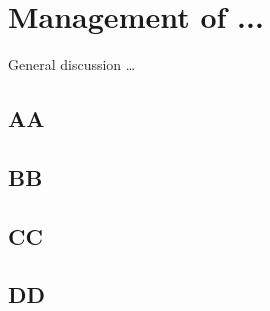 \chapter{Management of ...}

General discussion \ldots

\section{AA}

\section{BB}

\section{CC}

\section{DD}
